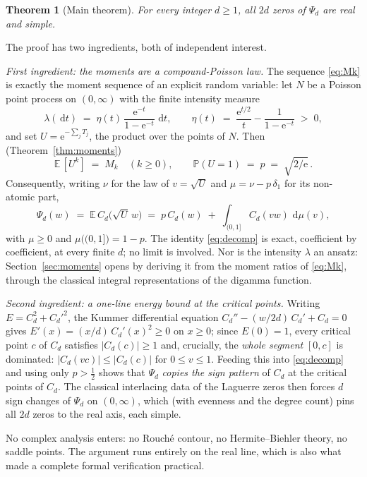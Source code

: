 \documentclass[11pt]{amsart}
\newtheorem{theorem}{Theorem}[section]
\theoremstyle{definition}
\theoremstyle{remark}
\newcommand{\dd}{\,\mathrm{d}}
\newcommand{\e}{\mathrm{e}}
\newcommand{\E}{\mathbb{E}}
\newcommand{\Prob}{\mathbb{P}}
\begin{document}
\begin{theorem}[Main theorem]\label{thm:main}
For every integer $d\ge 1$, all $2d$ zeros of $\Psi_d$ are real and
simple.
\end{theorem}

The proof has two ingredients, both of independent interest.

\emph{First ingredient: the moments are a compound-Poisson law.} The
sequence \eqref{eq:Mk} is exactly the moment sequence of an explicit
random variable: let $N$ be a Poisson point process on $(0,\infty)$
with the finite intensity measure
\[
\lambda(\dd t)\;=\;\eta(t)\,\frac{\e^{-t}}{1-\e^{-t}}\,\dd t,
\qquad
\eta(t)\;=\;\frac{\e^{t/2}}{t}-\frac{1}{1-\e^{-t}}\;>\;0 ,
\]
and set $U=\e^{-\sum_j T_j}$, the product over the points of $N$. Then
(Theorem~\ref{thm:moments})
\[
\E\,[U^k]\;=\;M_k \quad (k\ge 0),
\qquad
\Prob(U=1)\;=\;p\;=\;\sqrt{2/\e}\,.
\]
Consequently, writing $\nu$ for the law of $v=\sqrt{U}$ and
$\mu=\nu-p\,\delta_1$ for its non-atomic part,
\begin{equation}\label{eq:decomp}
\Psi_d(w)\;=\;\E\,C_d\bigl(\sqrt{U}\,w\bigr)
\;=\;p\,C_d(w)\;+\;\int_{(0,1]}C_d(vw)\,\dd\mu(v),
\end{equation}
with $\mu\ge 0$ and $\mu\bigl((0,1]\bigr)=1-p$.
The identity \eqref{eq:decomp} is exact, coefficient by coefficient,
at every finite $d$; no limit is involved. Nor is the intensity
$\lambda$ an ansatz: Section~\ref{sec:moments} opens by deriving it
from the moment ratios of \eqref{eq:Mk}, through the classical
integral representations of the digamma function.

\emph{Second ingredient: a one-line energy bound at the critical
points.} Writing $E=C_d^2+C_d'^2$, the Kummer differential equation
$C_d''-(w/2d)\,C_d'+C_d=0$ gives $E'(x)=(x/d)\,C_d'(x)^2\ge 0$ on
$x\ge 0$; since $E(0)=1$, every critical point $c$ of $C_d$ satisfies
$|C_d(c)|\ge 1$ and, crucially, the \emph{whole segment} $[0,c]$ is
dominated: $|C_d(vc)|\le |C_d(c)|$ for $0\le v\le 1$. Feeding this
into \eqref{eq:decomp} and using only $p>\tfrac12$ shows that
$\Psi_d$ \emph{copies the sign pattern} of $C_d$ at the critical
points of $C_d$. The classical interlacing data of the Laguerre zeros
then forces $d$ sign changes of $\Psi_d$ on $(0,\infty)$, which (with
evenness and the degree count) pins all $2d$ zeros to the real axis,
each simple.

No complex analysis enters: no Rouch\'e contour, no
Hermite--Biehler theory, no saddle points. The argument runs entirely
on the real line, which is also what made a complete formal
verification practical.
\end{document}
